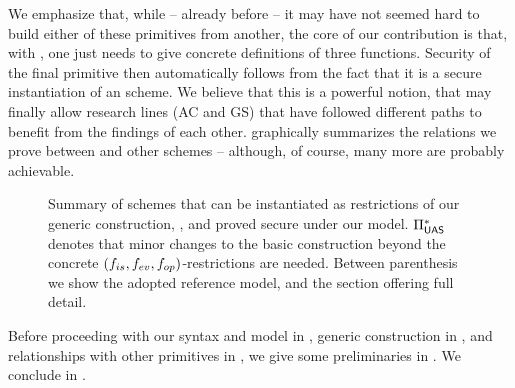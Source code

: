We emphasize that, while -- already before \UAS -- it may have not seemed hard
to build either of these primitives from another, the core of our contribution
is that, with \UAS, one just needs to give concrete definitions of three
functions. Security of the final primitive then automatically follows from the
fact that it is a secure instantiation of an \UAS scheme. We believe that this
is a powerful notion, that may finally allow research lines (AC and GS) that
have followed different paths to benefit from the findings of each other.
 graphically summarizes the relations we prove between
\UAS and other schemes -- although, of course, many more are probably
achievable.

\begin{figure}[ht!]
  \centering
  
  \caption{Summary of schemes that can be instantiated as restrictions of our
    generic construction, \CUASGen, and proved secure under our \UAS model.
    $\Pi_{\mathsf{UAS}}^{\ast}$ denotes that minor changes to the basic construction
    beyond the concrete $(f_{is},f_{ev},f_{op})$-restrictions are needed.
    Between parenthesis we show the adopted reference model, and the section
    offering full detail.
  }
  \label{fig:relations}
\end{figure}

Before proceeding with our \UAS syntax and model in , generic
construction \CUASGen in , and relationships with other primitives
in , we give some preliminaries in . We conclude in
.

